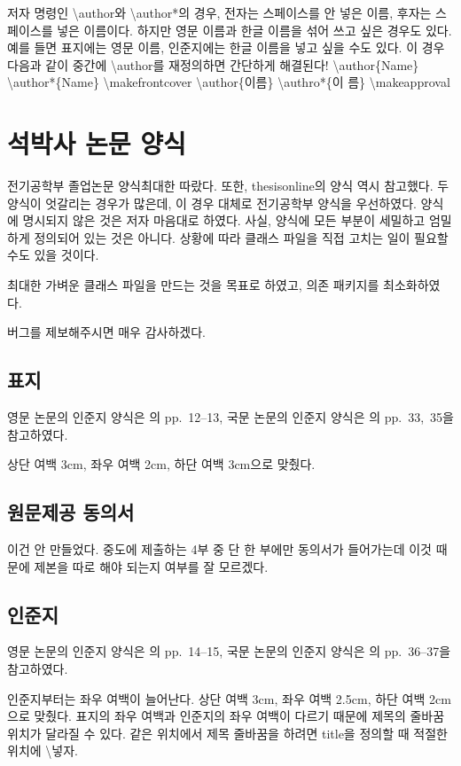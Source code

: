 \documentclass[a4paper]{report}
\begin{document}
저자 명령인 \textbackslash author와 \textbackslash author*의 경우,
전자는 스페이스를 안 넣은 이름, 후자는 스페이스를 넣은 이름이다.
하지만 영문 이름과 한글 이름을 섞어 쓰고 싶은 경우도 있다.
예를 들면 표지에는 영문 이름, 인준지에는 한글 이름을 넣고
싶을 수도 있다.
이 경우 다음과 같이 중간에 \textbackslash author를 재정의하면 간단하게
해결된다!
\textbackslash author\{Name\} \textbackslash author*\{Name\}
\textbackslash makefrontcover
\textbackslash author\{이름\} \textbackslash authro*\{이 름\}
\textbackslash makeapproval

\chapter{석박사 논문 양식}

전기공학부 졸업논문 양식\cite{under,grad}\을 최대한 따랐다.
또한, thesisonline의 양식 역시 참고했다.
두 양식이 엇갈리는 경우가 많은데,
이 경우 대체로 전기공학부 양식을 우선하였다.
양식에 명시되지 않은 것은 저자 마음대로 하였다.
사실, 양식에 모든 부분이 세밀하고 엄밀하게
정의되어 있는 것은 아니다.
상황에 따라 클래스 파일을 직접 고치는 일이
필요할 수도 있을 것이다.

최대한 가벼운 클래스 파일을 만드는 것을
목표로 하였고, 의존 패키지를 최소화하였다.

버그를 제보해주시면 매우 감사하겠다.

\section{표지}
영문 논문의 인준지 양식은 \cite{grad}의 pp.~12--13,
국문 논문의 인준지 양식은 \cite{grad}의 pp.~33,~35을 참고하였다.

상단 여백 3cm, 좌우 여백 2cm, 하단 여백 3cm으로 맞췄다.

\section{원문제공 동의서}
이건 안 만들었다. 중도에 제출하는 4부 중 단 한 부에만
동의서가 들어가는데 이것 때문에 제본을 따로 해야
되는지 여부를 잘 모르겠다.

\section{인준지}
영문 논문의 인준지 양식은 \cite{grad}의 pp.~14--15,
국문 논문의 인준지 양식은 \cite{grad}의 pp.~36--37을 참고하였다.

인준지부터는 좌우 여백이 늘어난다.
상단 여백 3cm, 좌우 여백 2.5cm, 하단 여백 2cm으로 맞췄다.
표지의 좌우 여백과 인준지의 좌우 여백이 다르기 때문에
제목의 줄바꿈 위치가 달라질 수 있다.
같은 위치에서 제목 줄바꿈을 하려면 title을 정의할 때
적절한 위치에 \textbackslash{} 넣자.
\end{document}
